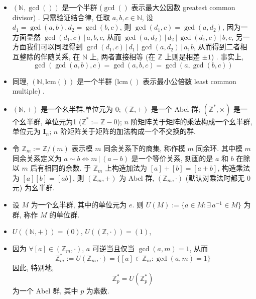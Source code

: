 \documentclass[UTF8]{book}
\begin{document}
\begin{example}
    \begin{itemize}
        \item $ (\mathbb{N},\gcd()) $ 是一个半群 
        ($\gcd()$ 表示最大公因数 greatest common divisor) . 
        只需验证结合律, 任取 $a,b,c \in \mathbb{N}$, 
        设 $ d_1 = \gcd(a,b), d_2 = \gcd(b,c) $, 
        则 $ \gcd(d_1,c) = \gcd(a,d_2)$, 
        因为一方面显然 $ \gcd(d_1,c)\,|\,a,b,c$, 
        从而 $\gcd(a,d_2)\,|\,d_2\,|\,\gcd(d_1,c)\,|\,b,c$, 
        另一方面我们可以同理得到 
        $\gcd(d_1,c)\,|\,d_1\,|\,\gcd(a,d_2)\,|\,a,b$, 
        从而得到二者相互整除的伴随关系, 在 $\mathbb{N}$ 
        上, 两者直接相等 (在 $\mathbb{Z}$ 上则是相差 $\pm 1$) .
        事实上, $$ \gcd(\gcd(a,b),c) =
        \gcd(a,b,c) = \gcd(a,\gcd(b,c)) $$

        \item 同理, $ (\mathbb{N},\mathrm{lcm}()) $ 是一个半群 
        ($\mathrm{lcm}()$ 表示最小公倍数 least common multiple) .
        
        \item $ (\mathbb{N},+) $ 是一个幺半群,单位元为 0; 
        $ (\mathbb{Z},+) $ 是一个 Abel 群; 
        $ (\mathbb{Z}^*,\times) $ 是一个幺半群, 单位元为1
        ($\mathbb{Z}^* := \mathbb{Z}-{0}$); 
        $n$ 阶矩阵关于矩阵的乘法构成一个幺半群, 单位元为 $\boldsymbol{I}_n$; 
        $n$ 阶矩阵关于矩阵的加法构成一个不交换的群. 

        \item 令 $\mathbb{Z}_m := \mathbb{Z}/(m)$ 
        表示模 $m$ 同余关系下的商集, 称作模 $m$ 同余环. 
        其中模 $m$ 同余关系定义为 
        $a\sim b \Leftrightarrow m \,|\, (a-b)$ 是一个等价关系, 
        刻画的是 $a$ 和 $b$ 在除以 $m$ 后有相同的余数. 
        于 $\mathbb{Z}_m$ 上构造加法为 $[a]+[b] = [a+b]$, 
        构造乘法为 $[a][b]=[ab]$, 
        则 $(\mathbb{Z}_m,+)$ 为 Abel 群, 
        $(\mathbb{Z}_m,\cdot)$ (默认对乘法时都无 0 元) 
        为幺半群. 

        \item 设 $ M $ 为一个幺半群, 其中的单位元为 $e$. 
        则 $U(M):=\{a\in M: \exists \, a^{-1} \in M\}$ 
        为群, 称作 $M$ 的单位群. 

        \item $U((\mathbb{N},+))=(0)$, $U((\mathbb{Z},\cdot))=(1)$, 
        
        \item 因为 $\forall [a] \in (\mathbb{Z}_m,\cdot)$, 
        $a$ 可逆当且仅当 $\gcd(a,m)=1$, 
        从而 
        $$\mathbb{Z}_m^*:=U(\mathbb{Z}_m,\cdot)
        = \{[a]\in \mathbb{Z}_m: \gcd(a,m)=1\}$$
        因此, 特别地, 
        $$ \mathbb{Z}_p^* = U(\mathbb{Z}_p^* ) $$
        为一个 Abel 群, 其中 $p$ 为素数. 
    \end{itemize}
\end{example}
\end{document}
